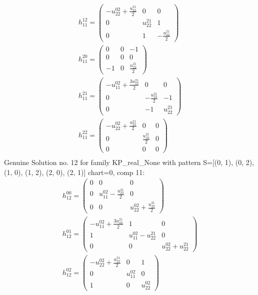 \documentclass[a4paper, 11pt, twoside, onecolumn]{article}
\begin{document}
\begin{landscape}
\begin{gather*}
	 h_{11}^{12}=\begin{pmatrix}- u^{02}_{22} + \frac{u^{21}_{22}}{2} & 0 & 0\\0 & u^{21}_{22} & 1\\0 & 1 & - \frac{u^{21}_{22}}{2}\end{pmatrix}\\ 
	 h_{11}^{20}=\begin{pmatrix}0 & 0 & -1\\0 & 0 & 0\\-1 & 0 & \frac{u^{21}_{22}}{2}\end{pmatrix}\\ 
	 h_{11}^{21}=\begin{pmatrix}- u^{02}_{11} + \frac{3 u^{21}_{22}}{2} & 0 & 0\\0 & - \frac{u^{21}_{22}}{2} & -1\\0 & -1 & u^{21}_{22}\end{pmatrix}\\ 
	 h_{11}^{22}=\begin{pmatrix}- u^{02}_{22} + \frac{u^{21}_{22}}{2} & 0 & 0\\0 & \frac{u^{21}_{22}}{2} & 0\\0 & 0 & 0\end{pmatrix}\\ 
\end{gather*} 
Genuine Solution no. 12 for family KP_real_None with pattern S=[(0, 1), (0, 2), (1, 0), (1, 2), (2, 0), (2, 1)] chart=0, comp 11: 
\begin{gather*} 
	 h_{12}^{00}=\begin{pmatrix}0 & 0 & 0\\0 & u^{02}_{11} - \frac{u^{21}_{22}}{2} & 0\\0 & 0 & u^{02}_{22} + \frac{u^{21}_{22}}{2}\end{pmatrix}\\ 
	 h_{12}^{01}=\begin{pmatrix}- u^{02}_{11} + \frac{3 u^{21}_{22}}{2} & 1 & 0\\1 & u^{02}_{11} - u^{21}_{22} & 0\\0 & 0 & u^{02}_{22} + u^{21}_{22}\end{pmatrix}\\ 
	 h_{12}^{02}=\begin{pmatrix}- u^{02}_{22} + \frac{u^{21}_{22}}{2} & 0 & 1\\0 & u^{02}_{11} & 0\\1 & 0 & u^{02}_{22}\end{pmatrix}\\ 

\end{gather*}
\end{landscape}
\end{document}

